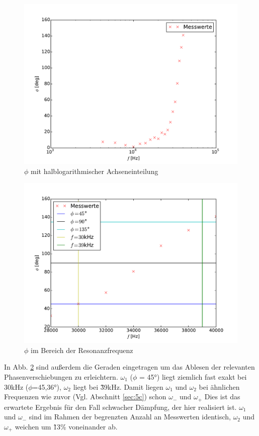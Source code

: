 \begin{figure}
  \centering
  \includegraphics[width=\textwidth]{5d.pdf}
  \caption{$\phi$ mit halblogarithmischer Achseneinteilung}
  \label{fig:5dlog}
\end{figure}

\begin{figure}
  \centering
  \includegraphics[width=\textwidth]{5d2.pdf}
  \caption{$\phi$ im Bereich der Resonanzfrequenz}
  \label{fig:5dlin}
\end{figure}

In Abb. \ref{fig:5dlin} sind außerdem die Geraden eingetragen um das Ablesen
der relevanten Phasenverschiebungen zu erleichtern.
$\omega_1$ ($\phi$ = 45°) liegt ziemlich fast exakt bei 30kHz ($\phi$=45,36°),
$\omega_2$ liegt bei \~ 39kHz. Damit liegen $\omega_1$ und $\omega_2$ bei
ähnlichen Frequenzen wie zuvor (Vgl. Abschnitt \ref{sec:5c}) schon $\omega_-$
und $\omega_+$ Dies ist das erwartete Ergebnis für den Fall schwacher
Dämpfung, der hier realisiert ist. $\omega_1$ und $\omega_-$ sind im Rahmen
der begrenzten Anzahl an Messwerten identisch, $\omega_2$ und $\omega_+$ weichen
um \~13\% voneinander ab.
